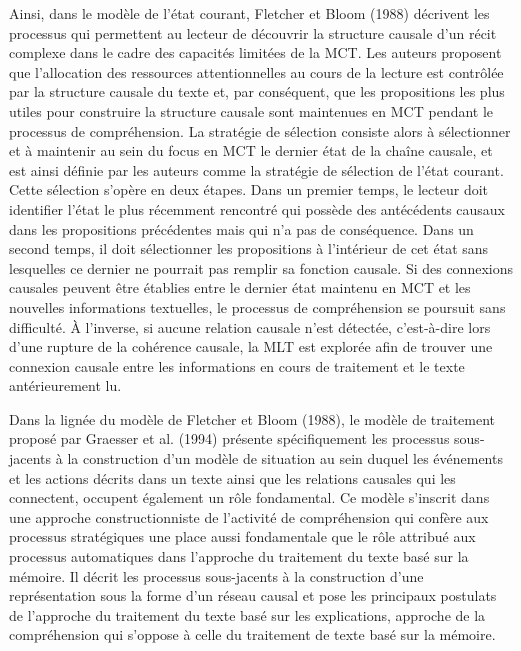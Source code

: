 Ainsi, dans le modèle de l’état courant, Fletcher et Bloom (1988) décrivent les processus qui permettent au lecteur de découvrir la structure causale d’un récit complexe dans le cadre des capacités limitées de la MCT. Les auteurs proposent que l’allocation des ressources attentionnelles au cours de la lecture est contrôlée par la structure causale du texte et, par conséquent, que les propositions les plus utiles pour construire la structure causale sont maintenues en MCT pendant le processus de compréhension. La stratégie de sélection consiste alors à sélectionner et à maintenir au sein du focus en MCT le dernier état de la chaîne causale, et est ainsi définie par les auteurs comme la stratégie de sélection de l’état courant. Cette sélection s’opère en deux étapes. Dans un premier temps, le lecteur doit identifier l’état le plus récemment rencontré qui possède des antécédents causaux dans les propositions précédentes mais qui n’a pas de conséquence. Dans un second temps, il doit sélectionner les propositions à l’intérieur de cet état sans lesquelles ce dernier ne pourrait pas remplir sa fonction causale. Si des connexions causales peuvent être établies entre le dernier état maintenu en MCT et les nouvelles informations textuelles, le processus de compréhension se poursuit sans difficulté. À l’inverse, si aucune relation causale n’est détectée, c’est-à-dire lors d’une rupture de la cohérence causale, la MLT est explorée afin de trouver une connexion causale entre les informations en cours de traitement et le texte antérieurement lu.

Dans la lignée du modèle de Fletcher et Bloom (1988), le modèle de traitement proposé par Graesser et al. (1994) présente spécifiquement les processus sous-jacents à la construction d’un modèle de situation au sein duquel les événements et les actions décrits dans un texte ainsi que les relations causales qui les connectent, occupent également un rôle fondamental. Ce modèle s’inscrit dans une approche constructionniste de l’activité de compréhension qui confère aux processus stratégiques une place aussi fondamentale que le rôle attribué aux processus automatiques dans l’approche du traitement du texte basé sur la mémoire. Il décrit les processus sous-jacents à la construction d’une représentation sous la forme d’un réseau causal et pose les principaux postulats de l’approche du traitement du texte basé sur les explications, approche de la compréhension qui s’oppose à celle du traitement de texte basé sur la mémoire.
